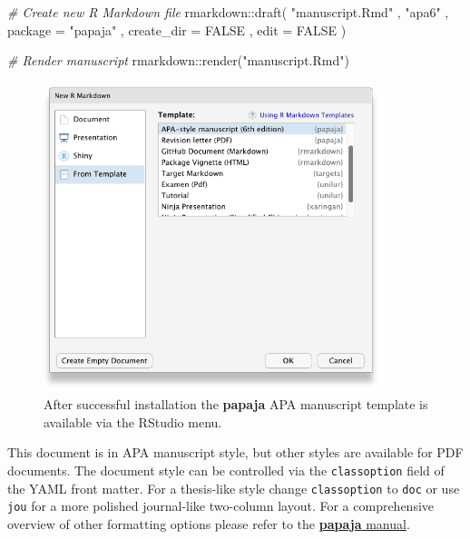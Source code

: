 \documentclass[
  ,man,floatsintext]{apa6}
\newenvironment{Shaded}{\begin{snugshade}}{\end{snugshade}}
\newcommand{\AttributeTok}[1]{\textcolor[rgb]{0.77,0.63,0.00}{#1}}
\newcommand{\CommentTok}[1]{\textcolor[rgb]{0.56,0.35,0.01}{\textit{#1}}}
\newcommand{\ConstantTok}[1]{\textcolor[rgb]{0.00,0.00,0.00}{#1}}
\newcommand{\FunctionTok}[1]{\textcolor[rgb]{0.00,0.00,0.00}{#1}}
\newcommand{\NormalTok}[1]{#1}
\newcommand{\SpecialCharTok}[1]{\textcolor[rgb]{0.00,0.00,0.00}{#1}}
\newcommand{\StringTok}[1]{\textcolor[rgb]{0.31,0.60,0.02}{#1}}
\begin{document}
\begin{Shaded}
\begin{Highlighting}[]
\CommentTok{\# Create new R Markdown file}
\NormalTok{rmarkdown}\SpecialCharTok{::}\FunctionTok{draft}\NormalTok{(}
  \StringTok{"manuscript.Rmd"}
\NormalTok{  , }\StringTok{"apa6"}
\NormalTok{  , }\AttributeTok{package =} \StringTok{"papaja"}
\NormalTok{  , }\AttributeTok{create\_dir =} \ConstantTok{FALSE}
\NormalTok{  , }\AttributeTok{edit =} \ConstantTok{FALSE}
\NormalTok{)}

\CommentTok{\# Render manuscript}
\NormalTok{rmarkdown}\SpecialCharTok{::}\FunctionTok{render}\NormalTok{(}\StringTok{"manuscript.Rmd"}\NormalTok{)}
\end{Highlighting}
\end{Shaded}



\begin{figure}

{\centering \includegraphics[width=3.9in]{../inst/images/template_selection} 

}

\caption{After successful installation the \textbf{papaja} APA manuscript template is available via the RStudio menu.}\label{fig:rstudio}
\end{figure}

This document is in APA manuscript style, but other styles are available for PDF documents.
The document style can be controlled via the \texttt{classoption} field of the YAML front matter.
For a thesis-like style change \texttt{classoption} to \texttt{doc} or use \texttt{jou} for a more polished journal-like two-column layout.
For a comprehensive overview of other formatting options please refer to the \href{http://frederikaust.com/papaja_man/r-markdown-components.html\#rendering-options}{\textbf{papaja} manual}.
\end{document}
